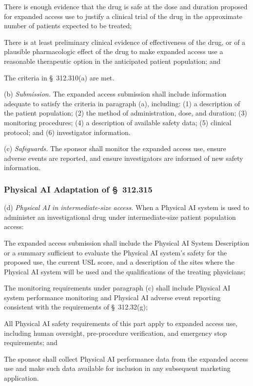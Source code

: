 \documentclass[11pt]{article}
\begin{document}
\begin{description}[leftmargin=0.5cm,style=sameline]
\item[(1)] There is enough evidence that the drug is safe at the dose and duration proposed for expanded access use to justify a clinical trial of the drug in the approximate number of patients expected to be treated;
\item[(2)] There is at least preliminary clinical evidence of effectiveness of the drug, or of a plausible pharmacologic effect of the drug to make expanded access use a reasonable therapeutic option in the anticipated patient population; and
\item[(3)] The criteria in \S~312.310(a) are met.
\end{description}

(b) \textit{Submission.} The expanded access submission shall include information adequate to satisfy the criteria in paragraph (a), including: (1) a description of the patient population; (2) the method of administration, dose, and duration; (3) monitoring procedures; (4) a description of available safety data; (5) clinical protocol; and (6) investigator information.

(c) \textit{Safeguards.} The sponsor shall monitor the expanded access use, ensure adverse events are reported, and ensure investigators are informed of new safety information.

\subsubsection{Physical AI Adaptation of \S~312.315}

(d) \textit{Physical AI in intermediate-size access.} When a Physical AI system is used to administer an investigational drug under intermediate-size patient population access:

\begin{description}[leftmargin=0.8cm,style=sameline]
\item[(i)] The expanded access submission shall include the Physical AI System Description or a summary sufficient to evaluate the Physical AI system's safety for the proposed use, the current USL score, and a description of the sites where the Physical AI system will be used and the qualifications of the treating physicians;
\item[(ii)] The monitoring requirements under paragraph (c) shall include Physical AI system performance monitoring and Physical AI adverse event reporting consistent with the requirements of \S~312.32(g);
\item[(iii)] All Physical AI safety requirements of this part apply to expanded access use, including human oversight, pre-procedure verification, and emergency stop requirements; and
\item[(iv)] The sponsor shall collect Physical AI performance data from the expanded access use and make such data available for inclusion in any subsequent marketing application.
\end{description}
\end{document}
